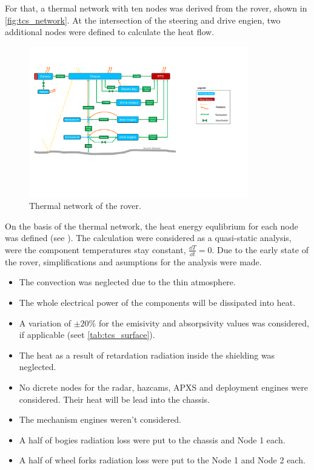 For that, a thermal network with ten nodes was derived from the rover, shown in \autoref{fig:tcs_network}.
At the intersection of the steering and drive engien, two additional nodes were defined to calculate the heat flow.

\begin{figure}[h]
	\centering
	\includegraphics[width=0.85\textwidth]{Media/tcs_network}
	\caption{Thermal network of the rover.}
	\label{fig:tcs_network}
\end{figure}

On the basis of the thermal network, the heat energy equlibrium for each node was defined (see ).
The calculation were considered as a quasi-static analysis, were the component temperatures stay constant, $\frac{\dd T}{\dd t}=0$.
Due to the early state of the rover, simplifications and asumptions for the analysis were made.
\begin{itemize}
	\item The convection was neglected due to the thin atmosphere.
	\item The whole electrical power of the components will be dissipated into heat.
	\item A variation of $\pm 20\%$ for the emisivity and absorpsivity values was considered, if applicable (seet \autoref{tab:tcs_surface}).
	\item The heat as a result of retardation radiation inside the shielding was neglected.
	\item No dicrete nodes for the radar, hazcams, APXS and deployment engines were considered. Their heat will be lead into the chassis.
	\item The mechanism engines weren't considered.
	\item A half of bogies radiation loss were put to the chassis and Node 1 each. 
	\item A half of wheel forks radiation loss were put to the Node 1 and Node 2 each. 
\end{itemize}


